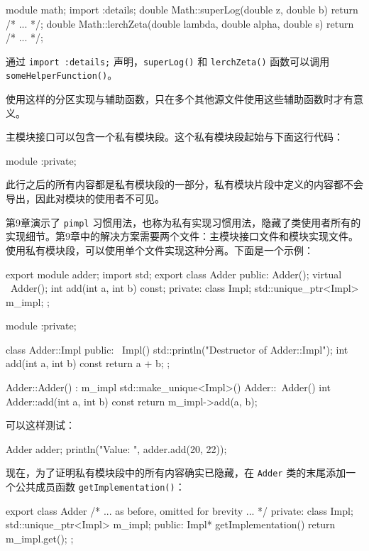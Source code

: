 \begin{cpp}
module math;
import :details;
double Math::superLog(double z, double b) { return /* ... */; }
double Math::lerchZeta(double lambda, double alpha, double s) { return /* ... */; }
\end{cpp}

通过 \verb|import :details;| 声明，\verb|superLog()| 和 \verb|lerchZeta()| 函数可以调用 \verb|someHelperFunction()|。

使用这样的分区实现与辅助函数，只在多个其他源文件使用这些辅助函数时才有意义。


主模块接口可以包含一个私有模块段。这个私有模块段起始与下面这行代码：

\begin{cpp}
module :private;
\end{cpp}

此行之后的所有内容都是私有模块段的一部分，私有模块片段中定义的内容都不会导出，因此对模块的使用者不可见。

第9章演示了 \verb|pimpl| 习惯用法，也称为私有实现习惯用法，隐藏了类使用者所有的实现细节。第9章中的解决方案需要两个文件：主模块接口文件和模块实现文件。使用私有模块段，可以使用单个文件实现这种分离。下面是一个示例：

\begin{cpp}
export module adder;
import std;
export class Adder
{
    public:
        Adder();
        virtual ~Adder();
        int add(int a, int b) const;
    private:
        class Impl;
        std::unique_ptr<Impl> m_impl;
};

module :private;

class Adder::Impl
{
    public:
        ~Impl() { std::println("Destructor of Adder::Impl"); }
        int add(int a, int b) const { return a + b;}
};

Adder::Adder() : m_impl { std::make_unique<Impl>() } { }
Adder::~Adder() {}
int Adder::add(int a, int b) const { return m_impl->add(a, b); }
\end{cpp}

可以这样测试：

\begin{cpp}
Adder adder;
println("Value: {}", adder.add(20, 22));
\end{cpp}

现在，为了证明私有模块段中的所有内容确实已隐藏，在 \verb|Adder| 类的末尾添加一个公共成员函数 \verb|getImplementation()|：

\begin{cpp}
export class Adder
{
    /* ... as before, omitted for brevity ... */
    private:
        class Impl;
        std::unique_ptr<Impl> m_impl;
    public:
        Impl* getImplementation() { return m_impl.get(); }
};
\end{cpp}

